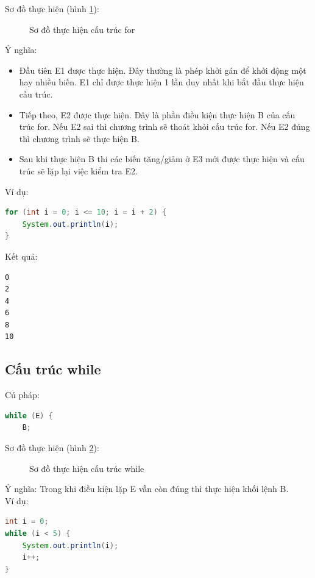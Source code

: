 \indent Sơ đồ thực hiện (hình \ref{hinh14}):\\
\begin{figure}[!ht]
\centering

\caption{Sơ đồ thực hiện cấu trúc for}\label{hinh14} 
\end{figure}

\indent Ý nghĩa: 
\begin{itemize}
\item Đầu tiên {\ttfamily E1} được thực hiện. Đây thường là phép khởi gán để khởi động một hay nhiều biến. {\ttfamily E1} chỉ được thực hiện 1 lần duy nhất khi bắt đầu thực hiện cấu trúc.
\item Tiếp theo, {\ttfamily E2} được thực hiện. Đây là phần điều kiện thực hiện {\ttfamily B} của cấu trúc for. Nếu {\ttfamily E2} sai thì chương trình sẽ thoát khỏi cấu trúc for. Nếu {\ttfamily E2} đúng thì chương trình sẽ thực hiện {\ttfamily B}.
\item Sau khi thực hiện {\ttfamily B} thi các biến tăng/giảm ở {\ttfamily E3} mới được thực hiện và cấu trúc sẽ lặp lại việc kiểm tra {\ttfamily E2}.
\end{itemize}
\indent Ví dụ:\\
\begin{lstlisting}[escapechar=',language=java]	
for (int i = 0; i <= 10; i = i + 2) {
	System.out.println(i);
}
\end{lstlisting}

\indent Kết quả:
\begin{verbatim}
0
2
4
6
8
10
\end{verbatim}
\subsection{Cấu trúc while}
\indent Cú pháp:
\begin{lstlisting}[escapechar=',language=java]	
while (E) {
	B;
\end{lstlisting}
\indent Sơ đồ thực hiện (hình \ref{hinh15}):
\begin{figure}[!ht]
\centering

\caption{Sơ đồ thực hiện cấu trúc while}\label{hinh15} 
\end{figure}

\indent Ý nghĩa: Trong khi điều kiện lặp {\ttfamily E} vẫn còn đúng thì thực hiện khối lệnh {\ttfamily B}.\\
\indent Ví dụ:
\begin{lstlisting}[escapechar=',language=java]	
int i = 0;
while (i < 5) {
	System.out.println(i);
	i++;
}\end{lstlisting}

